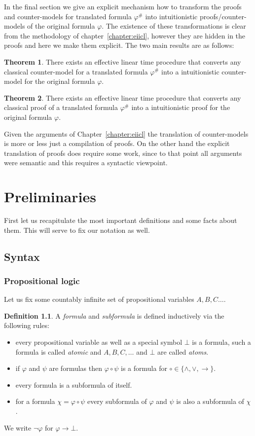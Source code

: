 \documentclass[a4paper,11pt]{report}
\theoremstyle{definition}
\newtheorem{theorem}{Theorem}[section]
\theoremstyle{definition}
\theoremstyle{definition}
\theoremstyle{definition}
\theoremstyle{definition}
\newtheorem{definition}[theorem]{Definition}
\theoremstyle{definition}
\theoremstyle{definition}
\begin{document}
	In the final section we give an explicit mechanism how to transform the proofs and counter-models for translated formula $\varphi^\#$ into intuitionistic proofs/counter-models of the original formula $\varphi$. The existence of these transformations is clear from the methodology of chapter~\ref{chapter:eiicl}, however they are hidden in the proofs and here we make them explicit. The two main results are as follows:
	\begin{theorem}
		There exists an effective linear time procedure that converts any classical counter-model for a translated formula $\varphi^\#$ into a intuitionistic counter-model for the original formula $\varphi$.
	\end{theorem}
	\begin{theorem}
		There exists an effective linear time procedure that converts any classical proof of a translated formula $\varphi^\#$ into a intuitionistic proof for the original formula $\varphi$.
	\end{theorem}
	
	Given the arguments of Chapter~\ref{chapter:eiicl} the translation of counter-models is more or less just a compilation of proofs. On the other hand the explicit translation of proofs does require some work, since to that point all arguments were semantic and this requires a syntactic viewpoint.

	\chapter{Preliminaries}
	First let us recapitulate the most important definitions and some facts about them. This will serve to fix our notation as well.
	
	\section{Syntax}
	
	\subsection{Propositional logic}
	
	Let us fix some countably infinite set of propositional variables $A, B, C\dots$.
	
	\begin{definition}
		A \textit{formula} and \textit{subformula} is defined inductively via the following rules:
		\begin{itemize}
			\item every propositional variable as well as a special symbol $\bot$ is a formula, such a formula is called \textit{atomic} and $A,B,C,\dots$ and $\bot$ are called \textit{atoms}.
			\item if $\varphi$ and $\psi$ are formulas then $\varphi\circ\psi$ is a formula for $\circ\in\{\wedge,\vee,\to\}$.
			\item every formula is a subformula of itself.
			\item for a formula $\chi = \varphi\circ\psi$ every subformula of $\varphi$ and $\psi$ is also a subformula of $\chi$.
		\end{itemize}
	We write $\neg \varphi$ for $\varphi\to \bot$.
	\end{definition}
\end{document}
